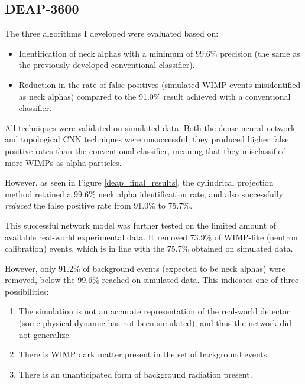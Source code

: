 \documentclass[12pt]{article}
\begin{document}
\subsection{DEAP-3600}

The three algorithms I developed were evaluated based on:

\begin{itemize}
    \item Identification of neck alphas with a minimum of 99.6\% precision (the same as the previously developed conventional classifier).
    \item Reduction in the rate of false positives (simulated WIMP events misidentified as neck alphas) compared to the 91.0\% result achieved with a conventional classifier.
\end{itemize}

All techniques were validated on simulated data. Both the dense neural network and topological CNN techniques were unsuccessful; they produced higher false positive rates than the conventional classifier, meaning that they misclassified more WIMPs as alpha particles.

However, as seen in Figure \ref{deap_final_results}, the cylindrical projection method retained a 99.6\% neck alpha identification rate, and also successfully \textit{reduced} the false positive rate from 91.0\% to 75.7\%.

This successful network model was further tested on the limited amount of available real-world experimental data. It removed 73.9\% of WIMP-like (neutron calibration) events, which is in line with the 75.7\% obtained on simulated data.

However, only 91.2\% of background events (expected to be neck alphas) were removed, below the 99.6\% reached on simulated data. This indicates one of three possibilities:

\begin{enumerate}
    \item The simulation is not an accurate representation of the real-world detector (some physical dynamic has not been simulated), and thus the network did not generalize.
    \item There is WIMP dark matter present in the set of background events.
    \item There is an unanticipated form of background radiation present.
\end{enumerate}
\end{document}
